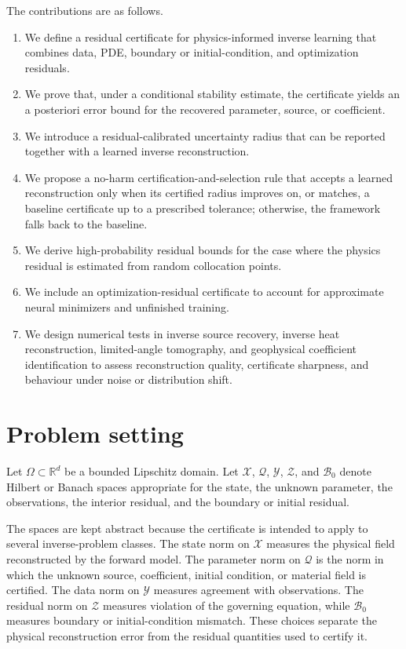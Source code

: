 \documentclass{article}
\numberwithin{equation}{section}
\theoremstyle{definition}
\begin{document}
The contributions are as follows.
\begin{enumerate}[label=(\roman*)]
\item We define a residual certificate for physics-informed inverse learning that combines data, PDE, boundary or initial-condition, and optimization residuals.
\item We prove that, under a conditional stability estimate, the certificate yields an a posteriori error bound for the recovered parameter, source, or coefficient.
\item We introduce a residual-calibrated uncertainty radius that can be reported together with a learned inverse reconstruction.
\item We propose a no-harm certification-and-selection rule that accepts a learned reconstruction only when its certified radius improves on, or matches, a baseline certificate up to a prescribed tolerance; otherwise, the framework falls back to the baseline.
\item We derive high-probability residual bounds for the case where the physics residual is estimated from random collocation points.
\item We include an optimization-residual certificate to account for approximate neural minimizers and unfinished training.
\item We design numerical tests in inverse source recovery, inverse heat reconstruction, limited-angle tomography, and geophysical coefficient identification to assess reconstruction quality, certificate sharpness, and behaviour under noise or distribution shift.
\end{enumerate}


\section{Problem setting}
\label{sec:problem-setting}

Let \(\Omega\subset\mathbb R^d\) be a bounded Lipschitz domain. Let \(\mathcal X\), \(\mathcal Q\), \(\mathcal Y\), \(\mathcal Z\), and \(\mathcal B_0\) denote Hilbert or Banach spaces appropriate for the state, the unknown parameter, the observations, the interior residual, and the boundary or initial residual.

The spaces are kept abstract because the certificate is intended to apply to several inverse-problem classes. The state norm on \(\mathcal X\) measures the physical field reconstructed by the forward model. The parameter norm on \(\mathcal Q\) is the norm in which the unknown source, coefficient, initial condition, or material field is certified. The data norm on \(\mathcal Y\) measures agreement with observations. The residual norm on \(\mathcal Z\) measures violation of the governing equation, while \(\mathcal B_0\) measures boundary or initial-condition mismatch. These choices separate the physical reconstruction error from the residual quantities used to certify it.
\end{document}
